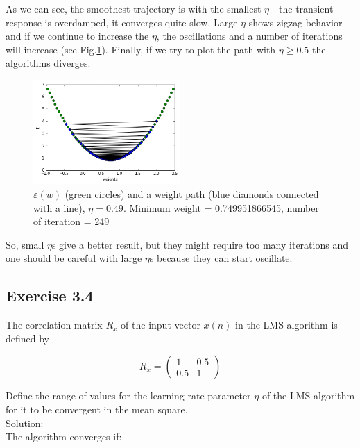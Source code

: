 \documentclass[a4paper, 12pt]{article}
\begin{document}
As we can see, the smoothest trajectory is with the smallest $\eta$ - the transient response is overdamped, it converges quite slow. Large $\eta$ shows zigzag behavior and if we continue to increase the $\eta$, the oscillations and a number of iterations will increase (see Fig.\ref{fig:EFunction049}). Finally, if we try to plot the path with $\eta \geqslant 0.5$ the algorithms diverges.

\begin{figure}[h]
  \centering
  \caption{$\varepsilon(w)$ (green circles) and a weight path (blue diamonds connected with a line), $\eta = 0.49$. Minimum weight = 0.749951866545, number of iteration = 249  \label{fig:EFunction049}}
  \includegraphics[width=0.5\textwidth]{EFunction049}
\end{figure}

So, small $\eta$s give a better result, but they might require too many iterations and one should be careful with large $\eta$s because they can start oscillate.\\

\cleardoublepage	

\subsection{Exercise 3.4}
The correlation matrix $R_x$ of the input vector $x(n)$ in the LMS algorithm is defined by

\[ R_x = \left( \begin{array}{ccc}
1 & 0.5 \\
0.5  & 1 \end{array} \right)\]

Define the range of values for the learning-rate parameter $\eta$ of the LMS algorithm for it to be convergent in the mean square.\\

Solution:\\

The algorithm converges if:\\
\end{document}
